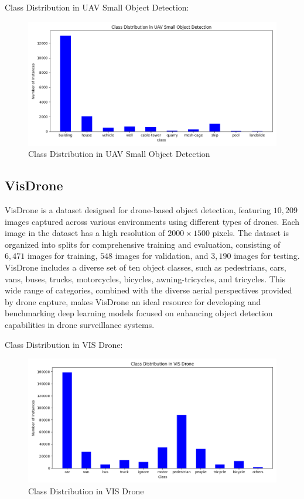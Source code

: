 Class Distribution in UAV Small Object Detection:

\begin{figure}[h!]
    \centering
    \includegraphics[scale=0.55]{Figures/uav_sod_data_class_distribution.png}
    \caption{Class Distribution in UAV Small Object Detection}
    \label{fig:uav-class}
\end{figure}


\subsection{VisDrone}

VisDrone is a dataset designed for drone-based object detection, featuring $10,209$ images captured across various environments using different 
types of drones. Each image in the dataset has a high resolution of $2000 \times 1500$ pixels. The dataset is organized into splits for comprehensive 
training and evaluation, consisting of $6,471$ images for training, $548$ images for validation, and $3,190$ images for testing. VisDrone includes a 
diverse set of ten object classes, such as pedestrians, cars, vans, buses, trucks, motorcycles, bicycles, awning-tricycles, and tricycles. This wide 
range of categories, combined with the diverse aerial perspectives provided by drone capture, makes VisDrone an ideal resource for developing and 
benchmarking deep learning models focused on enhancing object detection capabilities in drone surveillance systems.

Class Distribution in VIS Drone:

\begin{figure}[h!]
    \centering
    \includegraphics[scale=0.55]{Figures/vis_drone_data_class_distribution.png}
    \caption{Class Distribution in VIS Drone }
    \label{fig:vis-class}
\end{figure}



